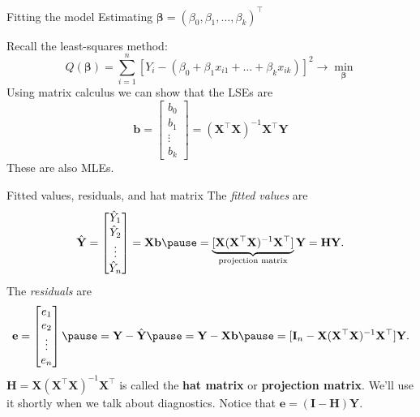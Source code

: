 \documentclass{beamer}
\begin{document}
\begin{frame}{Fitting the model}
Estimating $\boldsymbol\beta=(\beta_0,\beta_1,\ldots,\beta_k)^\top$
\vspace{10pt}

\pause Recall the least-squares method:
$$
Q(\boldsymbol\beta)=\sum_{i=1}^n[Y_i-(\beta_0+\beta_1 x_{i1}+\ldots+\beta_k x_{ik})]^2\longrightarrow\min_{\boldsymbol\beta}
$$
\pause Using matrix calculus we can show that the LSEs are
$$
\mathbf{b}=\begin{bmatrix}
b_0\\b_1\\\vdots\\b_k
\end{bmatrix}=(\mathbf{X}^\top\mathbf{X})^{-1}\mathbf{X}^\top\mathbf{Y}
$$
\pause These are also MLEs.
\end{frame}

\begin{frame}{Fitted values, residuals, and hat matrix}
The \textit{fitted values} are 
$$
\hat{\mathbf{Y}}=\begin{bmatrix}
\hat{Y}_1\\\hat{Y}_2\\\vdots\\\hat{Y}_n
\end{bmatrix}=\mathbf{Xb}\pause=\underbrace{[\mathbf{X}(\mathbf{X}^\top\mathbf{X})^{-1}\mathbf{X}^\top]}_{\text{projection matrix}}\mathbf{Y} = \mathbf{HY}.
$$
\pause The \textit{residuals} are 
$$
\mathbf{e}=\begin{bmatrix}
e_1\\e_2\\\vdots\\e_n
\end{bmatrix}\pause=\mathbf{Y}-\hat{\mathbf{Y}}\pause=\mathbf{Y}-\mathbf{Xb}\pause=[\mathbf{I}_n-\mathbf{X}(\mathbf{X}^\top\mathbf{X})^{-1}\mathbf{X}^\top]\mathbf{Y}.
$$\pause
$\mathbf{H}=\mathbf{X}(\mathbf{X}^\top\mathbf{X})^{-1}\mathbf{X}^\top$ is called the \textbf{hat matrix} or \textbf{projection matrix}. We'll use it shortly when we talk about diagnostics. Notice that $\mathbf{e}=(\mathbf{I}-\mathbf{H})\mathbf{Y}$.
\end{frame}
\end{document}
